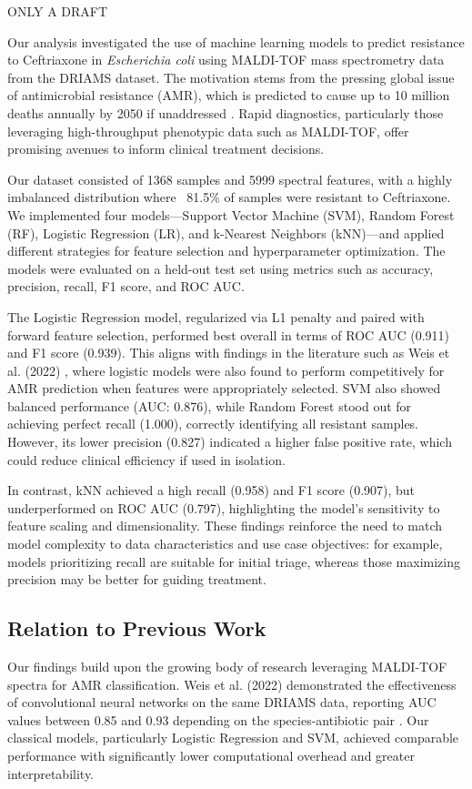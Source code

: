 \documentclass{article}
\begin{document}
ONLY A DRAFT

Our analysis investigated the use of machine learning models to predict resistance to Ceftriaxone in \textit{Escherichia coli} using MALDI-TOF mass spectrometry data from the DRIAMS dataset. The motivation stems from the pressing global issue of antimicrobial resistance (AMR), which is predicted to cause up to 10 million deaths annually by 2050 if unaddressed \citep{doi:10.1016/S1473-3099(15)70136-9}. Rapid diagnostics, particularly those leveraging high-throughput phenotypic data such as MALDI-TOF, offer promising avenues to inform clinical treatment decisions.

Our dataset consisted of 1368 samples and 5999 spectral features, with a highly imbalanced distribution where ~81.5\% of samples were resistant to Ceftriaxone. We implemented four models—Support Vector Machine (SVM), Random Forest (RF), Logistic Regression (LR), and k-Nearest Neighbors (kNN)—and applied different strategies for feature selection and hyperparameter optimization. The models were evaluated on a held-out test set using metrics such as accuracy, precision, recall, F1 score, and ROC AUC.

The Logistic Regression model, regularized via L1 penalty and paired with forward feature selection, performed best overall in terms of ROC AUC (0.911) and F1 score (0.939). This aligns with findings in the literature such as Weis et al. (2022) \citep{doi:10.1038/s41591-021-01619-9}, where logistic models were also found to perform competitively for AMR prediction when features were appropriately selected. SVM also showed balanced performance (AUC: 0.876), while Random Forest stood out for achieving perfect recall (1.000), correctly identifying all resistant samples. However, its lower precision (0.827) indicated a higher false positive rate, which could reduce clinical efficiency if used in isolation.

In contrast, kNN achieved a high recall (0.958) and F1 score (0.907), but underperformed on ROC AUC (0.797), highlighting the model’s sensitivity to feature scaling and dimensionality. These findings reinforce the need to match model complexity to data characteristics and use case objectives: for example, models prioritizing recall are suitable for initial triage, whereas those maximizing precision may be better for guiding treatment.

\subsection*{Relation to Previous Work}
Our findings build upon the growing body of research leveraging MALDI-TOF spectra for AMR classification. Weis et al. (2022) demonstrated the effectiveness of convolutional neural networks on the same DRIAMS data, reporting AUC values between 0.85 and 0.93 depending on the species-antibiotic pair \citep{doi:10.1038/s41591-021-01619-9}. Our classical models, particularly Logistic Regression and SVM, achieved comparable performance with significantly lower computational overhead and greater interpretability.
\end{document}
